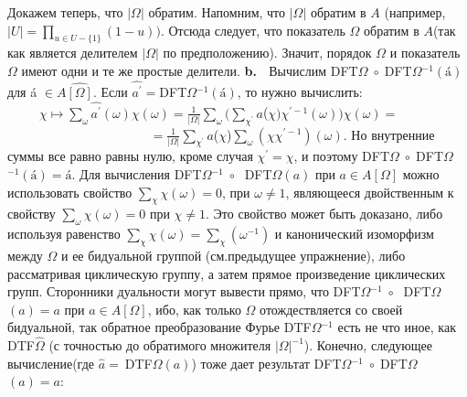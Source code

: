 \documentclass{../../template/mai_book}
\begin{document}
Докажем теперь, что $|\Omega|$ обратим. Напомним, что $|\Omega|$ обратим в $A$ (например, $|U| = \prod_{u \in U - \{1 \}}(1 - u))$. Отсюда следует, что показатель $\Omega$ обратим в $A$(так как является делителем $|\Omega|$ по предположению). Значит, порядок $\Omega$ и показатель $\Omega$ имеют одни и те же простые делители. \newline \indent
\textbf{b.} $\;$ Вычислим DFT{\scriptsize $\Omega$}$\; \circ \; $DFT{\scriptsize $\Omega$}$^{-1}(\text{\'a})$ для \'a $\in A \widehat{[\Omega]}$. Если $\widehat{a^{'}} = $DFT{\scriptsize $\Omega$}$^{-1}(\text{\'a})$, то нужно вычислить: \newline \newline \indent
$\;\;\;\;\;\;\;\;\; \chi \longmapsto \sum \limits_{\omega} \widehat{a^{'}} (\omega)\chi (\omega) = \frac{1}{|\Omega|}\sum \limits_{\omega}(\sum \limits_{\chi^{'}}$\'{$a$}(\'{$\chi$}$)\chi^{'-1}(\omega))\chi(\omega) =$ \newline \indent
$\;\;\;\;\;\;\;\;\;\;\;\;\;\;\;\;\;\;\;\;\;\;\;\;\;\;\;\;\;\;\;\;\;\;\;\;\;\;\;\;= \frac{1}{|\Omega|}\sum \limits_{\chi^{'}}$\'{$a$}(\'{$\chi$})$\sum \limits_{\omega}(\chi \chi^{'-1})(\omega).$ \newline \newline\newline
Но внутренние суммы все равно равны нулю, кроме случая $\chi^{'} = \chi$, и поэтому DFT{\scriptsize $\Omega$}$ \; \circ \; $DFT{\scriptsize $\Omega$}$^{-1}(\text{\'a}) = \text{\'a}$. Для вычисления DFT{\scriptsize $\Omega$}$^{-1} \; \circ \;$ DFT{\scriptsize $\Omega$}$(a)$ при
\newpage
\noindent
$a \in A[\Omega]$ можно использовать свойство $\sum_{\chi}\chi (\omega) = 0$, при $\omega \neq 1$, являющееся двойственным к свойству $\sum_{\omega}\chi (\omega) = 0$ при $\chi \neq 1$. Это свойство может быть доказано, либо используя равенство $\sum_{\chi}\chi (\omega) = \sum_{\chi}(\omega^{-1})$ и канонический изоморфизм между $\Omega$ и ее бидуальной группой (см.предыдущее упражнение), либо рассматривая циклическую группу, а затем прямое произведение циклических групп. Сторонники дуальности могут вывести прямо, что DFT{\scriptsize $\Omega$}$^{-1} \; \circ \; $ DFT{\scriptsize $\Omega$}$(a) = a$ при $a \in A[\Omega]$, ибо, как только $\Omega$ отождествляется со своей бидуальной, так обратное преобразование Фурье DTF{\scriptsize $\Omega$}$^{-1}$ есть не что иное, как DTF{\scriptsize${\hat \Omega}$} (с точностью до обратимого множителя $|\Omega|^{-1}$). Конечно, следующее вычисление(где $\hat a = \: $DTF{\scriptsize $\Omega$}$(a)$) тоже дает результат DFT{\scriptsize $\Omega$}$^{-1}  \;\circ \; $DFT{\scriptsize $\Omega$}$(a) = a$: \newline \newline \indent
\end{document}
